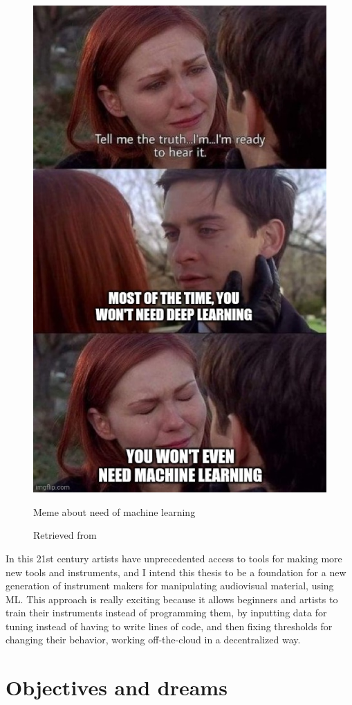 \begin{figure}[ht]
  \centering
  \includegraphics[width=0.75\linewidth,height=0.50\textheight,keepaspectratio]{images/meme-spider-man.jpg}
  \caption{Meme about need of machine learning}
  \caption*{Retrieved from \cite{website-twitter-dynamicwebpaige-meme}}
  \label{fig:meme-spider-man}
\end{figure}

In this 21st century artists have unprecedented access to tools for making more new tools and instruments, and I intend this thesis to be a foundation for a new generation of instrument makers for manipulating audiovisual material, using \acrshort{ML}. This approach is really exciting because it allows beginners and artists to train their instruments instead of programming them, by inputting data for tuning instead of having to write lines of code, and then fixing thresholds for changing their behavior, working off-the-cloud in a decentralized way.

\section{Objectives and dreams}

